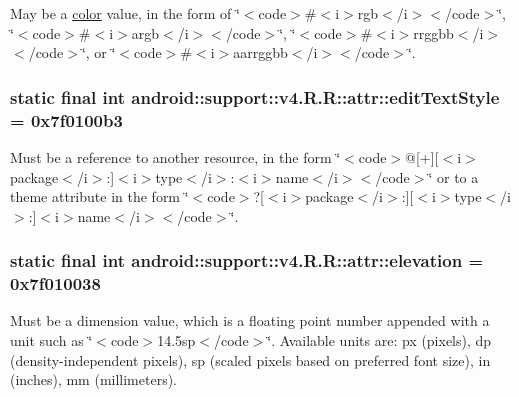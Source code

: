May be a \hyperlink{classandroid_1_1support_1_1v4_1_1_r_1_1color}{color} value, in the form of \char`\"{}$<$code$>$\#$<$i$>$rgb$<$/i$>$$<$/code$>$\char`\"{}, \char`\"{}$<$code$>$\#$<$i$>$argb$<$/i$>$$<$/code$>$\char`\"{}, \char`\"{}$<$code$>$\#$<$i$>$rrggbb$<$/i$>$$<$/code$>$\char`\"{}, or \char`\"{}$<$code$>$\#$<$i$>$aarrggbb$<$/i$>$$<$/code$>$\char`\"{}. \hypertarget{classandroid_1_1support_1_1v4_1_1_r_1_1attr_0c88fc4cf3f5b3d10b1d052127727a0e}{
\subsubsection[{editTextStyle}]{\setlength{\rightskip}{0pt plus 5cm}static final int android::support::v4.R.R::attr::editTextStyle = 0x7f0100b3}}
\label{classandroid_1_1support_1_1v4_1_1_r_1_1attr_0c88fc4cf3f5b3d10b1d052127727a0e}


Must be a reference to another resource, in the form \char`\"{}$<$code$>$@\mbox{[}+\mbox{]}\mbox{[}$<$i$>$package$<$/i$>$:\mbox{]}$<$i$>$type$<$/i$>$:$<$i$>$name$<$/i$>$$<$/code$>$\char`\"{} or to a theme attribute in the form \char`\"{}$<$code$>$?\mbox{[}$<$i$>$package$<$/i$>$:\mbox{]}\mbox{[}$<$i$>$type$<$/i$>$:\mbox{]}$<$i$>$name$<$/i$>$$<$/code$>$\char`\"{}. \hypertarget{classandroid_1_1support_1_1v4_1_1_r_1_1attr_0e0d61b87fd2656c5813cffe72aba679}{
\subsubsection[{elevation}]{\setlength{\rightskip}{0pt plus 5cm}static final int android::support::v4.R.R::attr::elevation = 0x7f010038}}
\label{classandroid_1_1support_1_1v4_1_1_r_1_1attr_0e0d61b87fd2656c5813cffe72aba679}


Must be a dimension value, which is a floating point number appended with a unit such as \char`\"{}$<$code$>$14.5sp$<$/code$>$\char`\"{}. Available units are: px (pixels), dp (density-independent pixels), sp (scaled pixels based on preferred font size), in (inches), mm (millimeters). 

